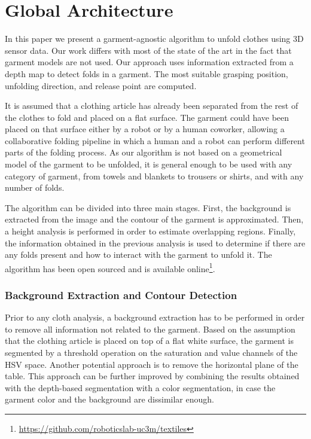 \chapter{Global Architecture}
\label{architecture}

In this paper we present a garment-agnostic algorithm to unfold clothes using 3D sensor data. Our work differs with most of the state of the art in the fact that garment models are not used. Our approach uses information extracted from a depth map to detect folds in a garment. The most suitable grasping position, unfolding direction, and release point are computed.

It is assumed that a clothing article has already been separated from the rest of the clothes to fold and placed on a flat surface. The garment could have been placed on that surface either by a robot or by a human coworker, allowing a collaborative folding pipeline in which a human and a robot can perform different parts of the folding process.
As our algorithm is not based on a geometrical model of the garment to be unfolded, it is general enough to be used with any category of garment, from towels and blankets to trousers or shirts, and with any number of folds. 

The algorithm can be divided into three main stages. First, the background is extracted from the image and the contour of the garment is approximated. Then, a height analysis is performed in order to estimate overlapping regions. Finally, the information obtained in the previous analysis is used to determine if there are any folds present and how to interact with the garment to unfold it. The algorithm has been open sourced and is available online\footnote{\url{https://github.com/roboticslab-uc3m/textiles}}.

\subsection{Background Extraction and Contour Detection}

Prior to any cloth analysis, a background extraction has to be performed in order to remove all information not related to the garment.
Based on the assumption that the clothing article is placed on top of a flat white surface, the garment is segmented by a threshold operation on the saturation and value channels of the HSV space. Another potential approach is to remove the horizontal plane of the table. This approach can be further improved by combining the results obtained with the depth-based segmentation with a color segmentation, in case the garment color and the background are dissimilar enough.

